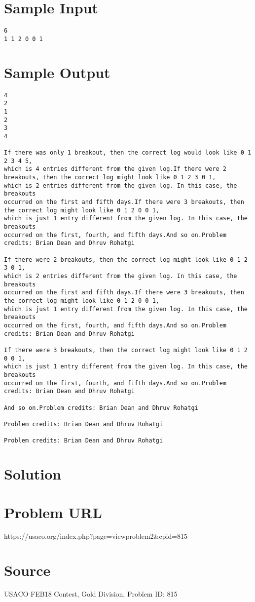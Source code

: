 \documentclass[12pt]{article}
\begin{document}
\section*{Sample Input}
\begin{verbatim}
6
1 1 2 0 0 1
\end{verbatim}

\section*{Sample Output}
\begin{verbatim}
4
2
1
2
3
4

If there was only 1 breakout, then the correct log would look like 0 1 2 3 4 5,
which is 4 entries different from the given log.If there were 2 breakouts, then the correct log might look like 0 1 2 3 0 1,
which is 2 entries different from the given log. In this case, the breakouts
occurred on the first and fifth days.If there were 3 breakouts, then the correct log might look like 0 1 2 0 0 1,
which is just 1 entry different from the given log. In this case, the breakouts
occurred on the first, fourth, and fifth days.And so on.Problem credits: Brian Dean and Dhruv Rohatgi

If there were 2 breakouts, then the correct log might look like 0 1 2 3 0 1,
which is 2 entries different from the given log. In this case, the breakouts
occurred on the first and fifth days.If there were 3 breakouts, then the correct log might look like 0 1 2 0 0 1,
which is just 1 entry different from the given log. In this case, the breakouts
occurred on the first, fourth, and fifth days.And so on.Problem credits: Brian Dean and Dhruv Rohatgi

If there were 3 breakouts, then the correct log might look like 0 1 2 0 0 1,
which is just 1 entry different from the given log. In this case, the breakouts
occurred on the first, fourth, and fifth days.And so on.Problem credits: Brian Dean and Dhruv Rohatgi

And so on.Problem credits: Brian Dean and Dhruv Rohatgi

Problem credits: Brian Dean and Dhruv Rohatgi

Problem credits: Brian Dean and Dhruv Rohatgi
\end{verbatim}

\section*{Solution}


\section*{Problem URL}
https://usaco.org/index.php?page=viewproblem2&cpid=815

\section*{Source}
USACO FEB18 Contest, Gold Division, Problem ID: 815
\end{document}
